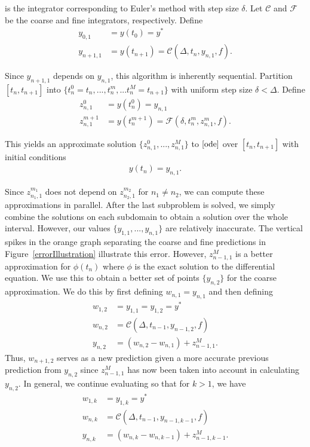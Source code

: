 \documentclass[12pt]{article}
\begin{document}
\noindent
is the integrator corresponding to Euler's method with step size $\delta$.
Let $\mathscr{C}$ and $\mathscr{F}$ be the coarse and fine integrators,
respectively. Define
\begin{align*}
   y_{0,1} &= y(t_0) = y^{*} \\
    y_{n+1,1} &= y(t_{n+1}) = \mathscr{C}(\Delta,t_n,y_{n,1},f)\mathrm{.}
\end{align*}

\noindent
Since $y_{n+1,1}$ depends on $y_{n,1}$, this algorithm is inherently
sequential. Partition $[t_n,t_{n+1}]$ into
$\{t_{n}^{0}=t_n,...,t_{n}^{m},...t_{n}^{M}=t_{n+1}\}$ with uniform step size $\delta < \Delta$. Define 
\begin{align*}\label{parallelDiscrete}
   z_{n,1}^{0} &= y(t_{n}^{0}) = y_{n,1} \\
    z_{n,1}^{m+1} &= y(t_{n}^{m+1}) = \mathscr{F}(\delta,t_{n}^{m},z_{n,1}^{m},f)\mathrm{.}
\end{align*}

\noindent
This yields an approximate solution $\{z_{n,1}^{0},...,z_{n,1}^{M}\}$ to
$\eqref{ode}$ over $[t_n,t_{n+1}]$ with initial conditions
\begin{align*}
   y(t_{n}) = y_{n,1}\mathrm{.}
\end{align*}

\noindent Since $z_{n_1,1}^{m_1}$ does not depend on $z_{n_2,1}^{m_2}$ for $n_1
\neq n_2$, we can compute these approximations in parallel. After the last
subproblem is solved, we simply combine the solutions on each subdomain to
obtain a solution over the whole interval. However, our values $\{
y_{1,1},...,y_{n,1} \}$ are relatively inaccurate. The vertical spikes in the
orange graph separating the coarse and fine predictions in
Figure~\ref{errorIllustration} illustrate this error.  However, $z_{n-1,1}^{M}$
is a better approximation for $\phi(t_n)$
 where $\phi$
is the exact solution to the differential equation.
We use this to obtain a 
better set of points $\{y_{n,2}\}$ for the coarse approximation. We do this by first defining $w_{n,1} = y_{n,1}$ and then defining
\begin{align*}
w_{1,2} &= y_{1,1} = y_{1,2} = y^{*} \\
w_{n,2} &= \mathscr{C}(\Delta,t_{n-1},y_{n-1,2},f)\\
y_{n,2} &= (w_{n,2}-w_{n,1}) + z_{n-1,1}^{M}\mathrm{.}
\end{align*}
Thus, $w_{n+1,2}$ serves as a new prediction given a more accurate previous prediction from $y_{n,2}$ since $z_{n-1,1}^{M}$ has now been taken into account in calculating $y_{n,2}$. In general, we continue evaluating so that for
$k > 1$, we have
\begin{align*}
w_{1,k} &= y_{1,k} = y^{*} \\
w_{n,k} &= \mathscr{C}(\Delta,t_{n-1},y_{n-1,k-1},f)\\
y_{n,k} &= (w_{n,k}-w_{n,k-1}) + z_{n-1,k-1}^{M}\mathrm{.}
\end{align*}
\end{document}
